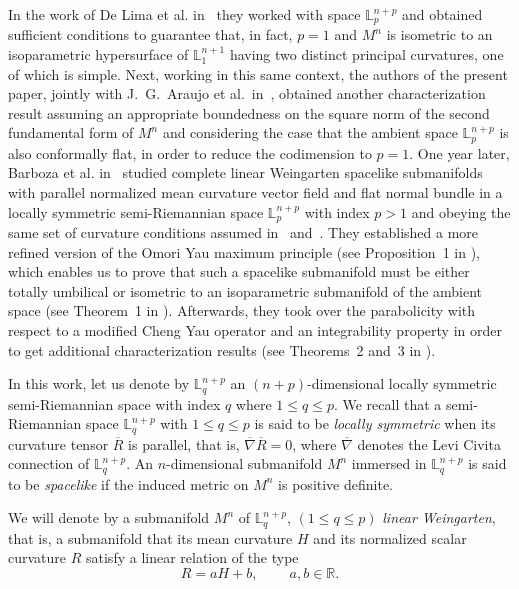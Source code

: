 \documentclass[leqno,11pt]{amsart}
\theoremstyle{plain}
\theoremstyle{definition}
\numberwithin{equation}{section}
\begin{document}
In the work of De Lima et al. in~\cite{Araujo:17} they worked with space $\mathbb{L}^{n+p}_p$ and obtained sufficient conditions to guarantee that, in fact, $p = 1$ and $M^n$ is isometric to an isoparametric hypersurface of $\mathbb{L}^{n+1}_1$ having two distinct principal curvatures, one of which is simple. Next, working in this same context, the authors of the present paper, jointly with J.~G.~Araujo et al.\ in~\cite{Weiller:2019}, obtained another characterization result assuming an appropriate boundedness on the square norm of the second fundamental form of $M^n$ and considering the case that the ambient space $\mathbb{L}^{n+p}_p$ is also conformally flat, in order to reduce the codimension to $p = 1$. One year later, Barboza et al. in~\cite{Weiller:2023} studied complete linear Weingarten spacelike submanifolds with parallel normalized mean curvature vector field and flat normal bundle in a locally symmetric semi-Riemannian space $\mathbb{L}^{n+p}_p$ with index $p > 1$ and obeying the same set of curvature conditions assumed in~\cite{Weiller:2019} and~\cite{Araujo:17}. They established a more refined version of the Omori Yau maximum principle (see Proposition~1 in \cite{Weiller:2023}), which enables us to prove that such a spacelike submanifold must be either totally umbilical or isometric to an isoparametric submanifold of the ambient space (see Theorem~1 in \cite{Weiller:2023} ). Afterwards, they took over the parabolicity with respect to a modified Cheng Yau operator and an integrability property in order to get additional characterization results (see Theorems~2 and~3 in \cite{Weiller:2023}).


In this work, let us denote by $\mathbb{L}^{n+p}_q$ an $(n + p)$-dimensional locally symmetric semi-Riemannian space with index $q$ where $1 \leq q \leq p$. We recall that a semi-Riemannian space $\mathbb{L}^{n+p}_q$ with $1\leq q \leq p$ is said to be \emph{locally symmetric} when its curvature tensor $\overline{R}$ is parallel, that is, $\overline{\nabla} \overline{R} = 0$, where $\overline{\nabla}$ denotes the Levi Civita connection of $\mathbb{L}^{n+p}_q$. An $n$-dimensional submanifold $M^n$ immersed in $\mathbb{L}^{n+p}_q$ is said to be \emph{spacelike} if the induced metric on $M^n$ is positive definite.

We will denote by  a submanifold $M^n$ of $\mathbb{L}^{n+p}_q$, $(1\leq q \leq p)$ \emph{linear Weingarten}, that is, a submanifold that its mean curvature $H$ and its normalized scalar curvature $R$ satisfy a linear relation of the type 
\begin{equation}\label{lw_relation}
R = aH + b, \quad \quad ~ a,b \in \mathbb{R}.
\end{equation}
\end{document}
